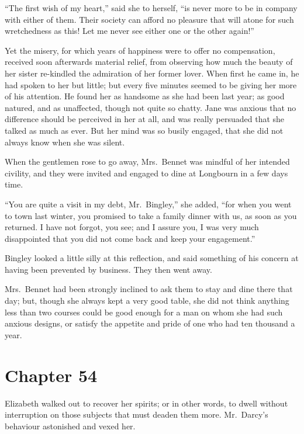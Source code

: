 ``The first wish of my heart,'' said she to herself, ``is never
more to be in company with either of them.  Their society can
afford no pleasure that will atone for such wretchedness as
this!  Let me never see either one or the other again!''

Yet the misery, for which years of happiness were to offer no
compensation, received soon afterwards material relief, from
observing how much the beauty of her sister re-kindled the
admiration of her former lover.  When first he came in, he had
spoken to her but little; but every five minutes seemed to be
giving her more of his attention.  He found her as handsome as
she had been last year; as good natured, and as unaffected,
though not quite so chatty.  Jane was anxious that no difference
should be perceived in her at all, and was really persuaded that
she talked as much as ever.  But her mind was so busily engaged,
that she did not always know when she was silent.

When the gentlemen rose to go away, Mrs.\ Bennet was mindful of
her intended civility, and they were invited and engaged to
dine at Longbourn in a few days time.

``You are quite a visit in my debt, Mr.\ Bingley,'' she added,
``for when you went to town last winter, you promised to take
a family dinner with us, as soon as you returned.  I have not
forgot, you see; and I assure you, I was very much disappointed
that you did not come back and keep your engagement.''

Bingley looked a little silly at this reflection, and said
something of his concern at having been prevented by business.
They then went away.

Mrs.\ Bennet had been strongly inclined to ask them to stay and
dine there that day; but, though she always kept a very good
table, she did not think anything less than two courses could
be good enough for a man on whom she had such anxious designs,
or satisfy the appetite and pride of one who had ten thousand a
year.



\chapter{Chapter 54}


 Elizabeth walked out to recover
her spirits; or in other words, to dwell without interruption
on those subjects that must deaden them more.  Mr.\ Darcy's
behaviour astonished and vexed her.

